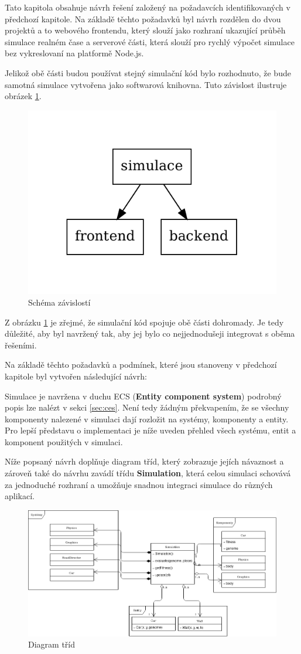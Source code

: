 Tato kapitola obsahuje návrh řešení založený na požadavcích identifikovaných v předchozí kapitole. Na základě těchto požadavků byl návrh rozdělen do dvou projektů a to webového frontendu, který slouží jako rozhraní ukazující průběh simulace realném čase a serverové části, která slouží pro rychlý výpočet simulace bez vykreslovaní na platformě Node.js.

Jelikož obě části budou používat stejný simulační kód bylo rozhodnuto, že bude samotná simulace vytvořena jako softwarová knihovna. Tuto závislost ilustruje obrázek \ref{fig:dependency}.
\begin{figure}[h!]
	\centering
	\includegraphics[width=0.4\linewidth]{architektura}
	\caption{Schéma závislostí}
	\label{fig:dependency}
\end{figure}


Z obrázku \ref{fig:dependency} je zřejmé, že simulační kód spojuje obě části dohromady. Je tedy důležité, aby byl navržený tak, aby jej bylo co nejjednodušeji integrovat s oběma řešeními.

Na základě těchto požadavků a podmínek, které jsou stanoveny v předchozí kapitole byl vytvořen následující návrh:

\label{sec:ECS}
Simulace je navržena v duchu ECS (\textbf{Entity component system}) podrobný popis lze nalézt v sekci \ref{sec:ces}. Není tedy žádným překvapením, že se všechny komponenty nalezené v simulaci dají rozložit na systémy, komponenty a entity. Pro lepší představu o implementaci je níže uveden přehled všech systému, entit a komponent použitých v simulaci.

Níže popsaný návrh doplňuje diagram tříd, který zobrazuje jejích návaznost a zároveň také do návrhu zavádí třídu \textbf{Simulation}, která celou simulaci schovává za jednoduché rozhraní a umožňuje snadnou integraci simulace do různých aplikací.

\begin{figure}[H]
	\centering
 	\includegraphics[width=0.7\linewidth]{classDiagram}
	\caption{Diagram tříd}
	\label{fig:class-diagram}
\end{figure}

